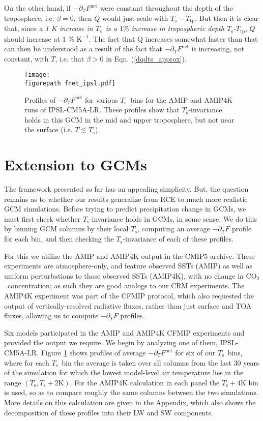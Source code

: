 \documentclass[10pt]{article}
\newcommand{\eqnref}[1]{(\ref{#1})}
\newcommand{\ppt}{\ensuremath{\partial_T}}
\newcommand{\cotwo}{\ensuremath{\mathrm{CO_2}}}
\newcommand{\Fnet}{\ensuremath{F^\mathrm{net}}}
\newcommand{\Ts}{\ensuremath{T_\mathrm{s}}}
\newcommand{\Ttp}{\ensuremath{T_\mathrm{tp}}}
\newcommand{\Kinverse}{\ensuremath{\mathrm{K^{-1}}}}
\newcommand{\Kelvin}{\ensuremath{\mathrm{K}}}
\newcommand{\figurepath}{../figures/}
\begin{document}
On the other hand, if $-\ppt \Fnet$ were constant throughout the depth of the troposphere, i.e. $\beta=0$, then $Q$ would just scale with $\Ts-\Ttp$. But then it is clear that, since \emph{a 1 K increase in \Ts\  is a $1\%$ increase in tropospheric depth \Ts-\Ttp}, $Q$ should increase at 1 \% \Kinverse. The fact that Q increases somewhat faster than that can then be understood as a result of the fact that $-\ppt \Fnet$ is increasing, not constant, with $T$, i.e. that $\beta>0$ in Eqn. \eqnref{dqdts_approx}.

\begin{figure}[t]
	\begin{center}
			\texttt{[image: \\figurepath fnet\_ipsl.pdf]}
		\caption{ Profiles of $-\ppt \Fnet$ for various \Ts\ bins for the AMIP and AMIP4K runs of IPSL-CM5A-LR.  These profiles show that \Ts-invariance holds in this GCM in the mid and upper troposphere, but not near the surface (i.e. $T \lesssim \Ts$).
		\label{fnet_ipsl}
		}
	\end{center}
\end{figure}


\section{Extension to GCMs} \label{sec_GCMs}
The framework presented so far has an appealing simplicity. But, the question remains as to whether our results generalize from RCE to much more realistic GCM simulations. Before trying to predict precipitation change in GCMs,  we must first check  whether \Ts-invariance holds in GCMs, in some sense. We do this by binning  GCM columns by their local \Ts, computing an average $-\ppt F$ profile for each bin, and then checking the \Ts-invariance of each of these profiles. 


For this we utilize the AMIP and AMIP4K  output in the CMIP5 archive. These experiments are atmosphere-only, and feature observed SSTs (AMIP) as well as uniform perturbations to those observed SSTs (AMIP4K), with no change in \cotwo\ concentration; as such they are good analogs to our CRM experiments. The AMIP4K experiment was part of the CFMIP protocol, which also requested the output of vertically-resolved radiative fluxes, rather than just surface and TOA fluxes, allowing us to compute $-\ppt F$ profiles.

Six models participated in the AMIP and AMIP4K CFMIP experiments and provided the output we require. We begin by analyzing one of them, IPSL-CM5A-LR. Figure \ref{fnet_ipsl} shows  profiles of average $-\ppt \Fnet$ for six of our \Ts\ bins, where for each \Ts\ bin the average is taken over  all columns from the last 30 years of the simulation for which the lowest model-level air temperature lies in the range $(\Ts,\Ts +2\Kelvin)$. For the AMIP4K calculation in each panel the $\Ts +4\Kelvin$ bin is used, so as to compare roughly the same columns between the two simulations. More details on this calculation are given in the Appendix, which also shows the decomposition of these profiles into their LW and SW components. 
\end{document}
